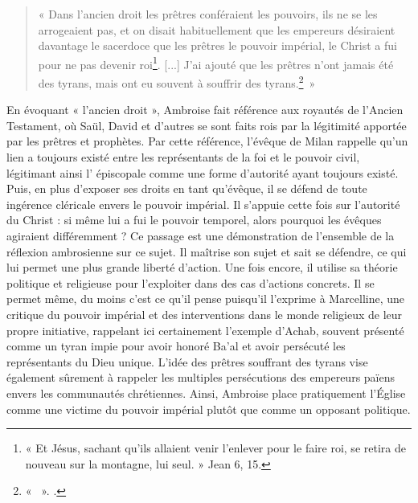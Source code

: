 \bigskip

\begin{quote}
    « Dans l’ancien droit les prêtres conféraient les pouvoirs, ils ne se les arrogeaient pas, et on disait habituellement que les empereurs désiraient davantage le sacerdoce que les prêtres le pouvoir impérial, le Christ a fui pour ne pas devenir roi\footnote{« Et Jésus, sachant qu'ils allaient venir l'enlever pour le faire roi, se retira de nouveau sur la montagne, lui seul. » Jean 6, 15.}. [...] J’ai ajouté que les prêtres n’ont jamais été des tyrans, mais ont eu souvent à souffrir des tyrans.\footnote{« ~». \cite[, 23]{ambroise_lettres}.}~»
\end{quote}

\bigskip

En évoquant « l'ancien droit », Ambroise fait référence aux royautés de l'Ancien Testament, où Saül, David et d'autres se sont faits rois par la légitimité apportée par les prêtres et prophètes. Par cette référence, l'évêque de Milan rappelle qu'un lien a toujours existé entre les représentants de la foi et le pouvoir civil, légitimant ainsi l' épiscopale comme une forme d'autorité ayant toujours existé. Puis, en plus d'exposer ses droits en tant qu'évêque, il se défend de toute ingérence cléricale envers le pouvoir impérial. Il s'appuie cette fois sur l'autorité du Christ : si même lui a fui le pouvoir temporel, alors pourquoi les évêques agiraient différemment ? Ce passage est une démonstration de l'ensemble de la réflexion ambrosienne sur ce sujet. Il maîtrise son sujet et sait se défendre, ce qui lui permet une plus grande liberté d'action. Une fois encore, il utilise sa théorie politique et religieuse pour l'exploiter dans des cas d'actions concrets. Il se permet même, du moins c'est ce qu'il pense puisqu'il l'exprime à Marcelline, une critique du pouvoir impérial et des interventions dans le monde religieux de leur propre initiative, rappelant ici certainement l'exemple d'Achab, souvent présenté comme un tyran impie pour avoir honoré Ba'al et avoir persécuté les représentants du Dieu unique. L'idée des prêtres souffrant des tyrans vise également sûrement à rappeler les multiples persécutions des empereurs païens envers les communautés chrétiennes. Ainsi, Ambroise place pratiquement l'Église comme une victime du pouvoir impérial plutôt que comme un opposant politique.

